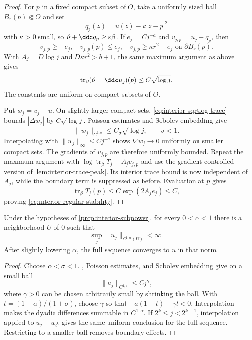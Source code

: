 \begin{proof}
For $p$ in a fixed compact subset of $O$, take a uniformly sized ball $B_r(p)\Subset O$ and set
\[
  q_p(z)=u(z)-\kappa|z-p|^2
\]
with $\kappa>0$ small, so $\vartheta+\ddc q_p\geq\varepsilon\beta$. If $e_j=Cj^{-a}$ and $v_{j,p}=u_j-q_p$, then
\[
  v_{j,p}\geq-e_j,
  \quad v_{j,p}(p)\leq e_j,
  \quad v_{j,p}\geq\kappa r^2-e_j\text{ on }\partial B_r(p).
\]
With $A_j=D\log j$ and $D\kappa r^2>b+1$, the same maximum argument as above gives
\begin{equation}\label{eq:interior-sqrtlog-trace}
  \operatorname{tr}_\beta(\vartheta+\ddc u_j)(p)\leq C\sqrt{\log j}.
\end{equation}
The constants are uniform on compact subsets of $O$.

Put $w_j=u_j-u$. On slightly larger compact sets, \eqref{eq:interior-sqrtlog-trace} bounds $|\Delta w_j|$ by $C\sqrt{\log j}$. Poisson estimates and Sobolev embedding give
\[
  \lVert w_j\rVert_{C^{1,\sigma}}\leq C_\sigma\sqrt{\log j},
  \qquad \sigma<1.
\]
Interpolating with $\lVert w_j\rVert_\infty\leq Cj^{-a}$ shows $\nabla w_j\to0$ uniformly on smaller compact sets. The gradients of $v_{j,p}$ are therefore uniformly bounded. Repeat the maximum argument with $\log\operatorname{tr}_\beta T_j-A_jv_{j,p}$ and use the gradient-controlled version of \cref{lem:interior-trace-peak}. Its interior trace bound is now independent of $A_j$, while the boundary term is suppressed as before. Evaluation at $p$ gives
\[
  \operatorname{tr}_\beta T_j(p)\leq C\exp(2A_je_j)\leq C,
\]
proving \eqref{eq:interior-regular-stability}.
\end{proof}

\begin{proposition}\label{prop:interior-uniform-c1a}
Under the hypotheses of \cref{prop:interior-subpower}, for every $0<\alpha<1$ there is a neighborhood $U$ of $0$ such that
\[
  \sup_j\lVert u_j\rVert_{C^{1,\alpha}(U)}<\infty.
\]
After slightly lowering $\alpha$, the full sequence converges to $u$ in that norm.
\end{proposition}

\begin{proof}
Choose $\alpha<\sigma<1$. , Poisson estimates, and Sobolev embedding give on a small ball
\[
  \lVert u_j\rVert_{C^{1,\sigma}}\leq Cj^\gamma,
\]
where $\gamma>0$ can be chosen arbitrarily small by shrinking the ball. With $t=(1+\alpha)/(1+\sigma)$, choose $\gamma$ so that $-a(1-t)+\gamma t<0$. Interpolation makes the dyadic differences summable in $C^{1,\alpha}$. If $2^k\leq j<2^{k+1}$, interpolation applied to $u_j-u_{2^k}$ gives the same uniform conclusion for the full sequence. Restricting to a smaller ball removes boundary effects.
\end{proof}


